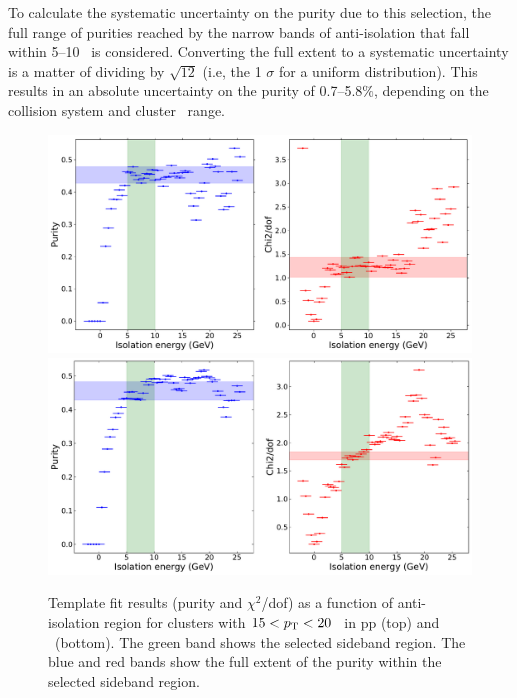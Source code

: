 To calculate the systematic uncertainty on the purity due to this selection, the full range of purities reached by the narrow bands of anti-isolation that fall within 5--10 \GeVc~is considered. Converting the full extent to a systematic uncertainty is a matter of dividing by $\sqrt{12}$ (i.e, the 1 $\sigma$ for a uniform distribution). This results in an absolute uncertainty on the purity of 0.7--5.8$\%$, depending on the collision system and cluster \pt~range.

\begin{figure}[htpb]
\center
\includegraphics[width=1.0\textwidth]{Data_Analysis/Purity/antiiso-selection-pp-cluster_Lambda-15-20.pdf}\\
\includegraphics[width=1.0\textwidth]{Data_Analysis/Purity/antiiso-selection-p-Pb-cluster_Lambda-15-20.pdf}
\caption{Template fit results (purity and $\chi^2$/dof) as a function of anti-isolation region for clusters with $15 < p_{\mathrm{T}} < 20$ \GeVc~in pp (top) and \pPb~(bottom). The green band shows the selected sideband region. The blue and red bands show the full extent of the purity within the selected sideband region.}
\label{sidebandslices}
\end{figure}

